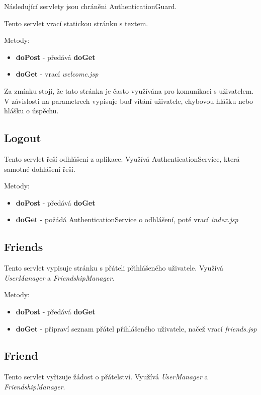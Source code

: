 \documentclass[
12pt,
a4paper,
pdftex,
czech,
titlepage
]{report}
\begin{document}
Následující servlety jsou chráněni AuthenticationGuard.

Tento servlet vrací statickou stránku s textem.

Metody:
\begin{itemize}
\item \textbf{doPost} - předává \textbf{doGet}
\item \textbf{doGet} - vrací \textit{welcome.jsp}
\end{itemize}

Za zmínku stojí, že tato stránka je často využívána pro komunikaci s uživatelem. V závislosti na parametrech vypisuje buď vítání uživatele, chybovou hlášku nebo hlášku o úspěchu.

\subsection{Logout}

Tento servlet řeší odhlášení z aplikace. Využívá AuthenticationService, která samotné dohlášení řeší.

Metody:
\begin{itemize}
\item \textbf{doPost} - předává \textbf{doGet}
\item \textbf{doGet} - požádá AuthenticationService o odhlášení, poté vrací \textit{index.jsp}
\end{itemize}

\subsection{Friends}

Tento servlet vypisuje stránku s přáteli přihlášeného uživatele. Využívá \textit{UserManager} a \textit{FriendshipManager}. 

Metody:
\begin{itemize}
\item \textbf{doPost} - předává \textbf{doGet}
\item \textbf{doGet} - připraví seznam přátel přihlášeného uživatele, načež vrací \textit{friends.jsp}
\end{itemize}

\subsection{Friend}

Tento servlet vyřizuje žádost o přátelství. Využívá \textit{UserManager} a \textit{FriendshipManager}.
\end{document}
